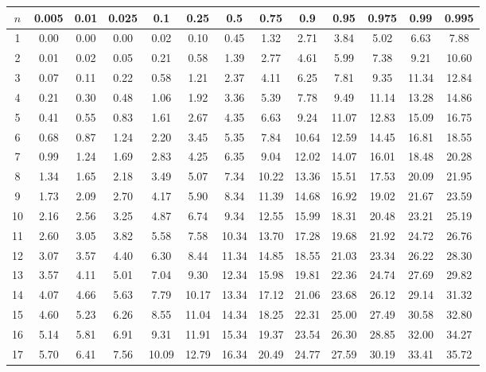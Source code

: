\setlength{\tabcolsep}{3pt}
\renewcommand{\arraystretch}{1}
\begin{center}
\begin{tabular}{c | c c c c c c c c c c c c}
$n$ & 0.005 & 0.01 & 0.025 & 0.1 & 0.25 & 0.5 & 0.75 & 0.9 & 0.95 & 0.975 & 0.99 & 0.995 \\
\hline
1 & 0.00 & 0.00 & 0.00 & 0.02 & 0.10 & 0.45 & 1.32 & 2.71 & 3.84 & 5.02 & 6.63 & 7.88 \\
2 & 0.01 & 0.02 & 0.05 & 0.21 & 0.58 & 1.39 & 2.77 & 4.61 & 5.99 & 7.38 & 9.21 & 10.60 \\
3 & 0.07 & 0.11 & 0.22 & 0.58 & 1.21 & 2.37 & 4.11 & 6.25 & 7.81 & 9.35 & 11.34 & 12.84 \\
4 & 0.21 & 0.30 & 0.48 & 1.06 & 1.92 & 3.36 & 5.39 & 7.78 & 9.49 & 11.14 & 13.28 & 14.86 \\
5 & 0.41 & 0.55 & 0.83 & 1.61 & 2.67 & 4.35 & 6.63 & 9.24 & 11.07 & 12.83 & 15.09 & 16.75 \\
6 & 0.68 & 0.87 & 1.24 & 2.20 & 3.45 & 5.35 & 7.84 & 10.64 & 12.59 & 14.45 & 16.81 & 18.55 \\
7 & 0.99 & 1.24 & 1.69 & 2.83 & 4.25 & 6.35 & 9.04 & 12.02 & 14.07 & 16.01 & 18.48 & 20.28 \\
8 & 1.34 & 1.65 & 2.18 & 3.49 & 5.07 & 7.34 & 10.22 & 13.36 & 15.51 & 17.53 & 20.09 & 21.95 \\
9 & 1.73 & 2.09 & 2.70 & 4.17 & 5.90 & 8.34 & 11.39 & 14.68 & 16.92 & 19.02 & 21.67 & 23.59 \\
10 & 2.16 & 2.56 & 3.25 & 4.87 & 6.74 & 9.34 & 12.55 & 15.99 & 18.31 & 20.48 & 23.21 & 25.19 \\
11 & 2.60 & 3.05 & 3.82 & 5.58 & 7.58 & 10.34 & 13.70 & 17.28 & 19.68 & 21.92 & 24.72 & 26.76 \\
12 & 3.07 & 3.57 & 4.40 & 6.30 & 8.44 & 11.34 & 14.85 & 18.55 & 21.03 & 23.34 & 26.22 & 28.30 \\
13 & 3.57 & 4.11 & 5.01 & 7.04 & 9.30 & 12.34 & 15.98 & 19.81 & 22.36 & 24.74 & 27.69 & 29.82 \\
14 & 4.07 & 4.66 & 5.63 & 7.79 & 10.17 & 13.34 & 17.12 & 21.06 & 23.68 & 26.12 & 29.14 & 31.32 \\
15 & 4.60 & 5.23 & 6.26 & 8.55 & 11.04 & 14.34 & 18.25 & 22.31 & 25.00 & 27.49 & 30.58 & 32.80 \\
16 & 5.14 & 5.81 & 6.91 & 9.31 & 11.91 & 15.34 & 19.37 & 23.54 & 26.30 & 28.85 & 32.00 & 34.27 \\
17 & 5.70 & 6.41 & 7.56 & 10.09 & 12.79 & 16.34 & 20.49 & 24.77 & 27.59 & 30.19 & 33.41 & 35.72 \\

\end{tabular}
\end{center}
